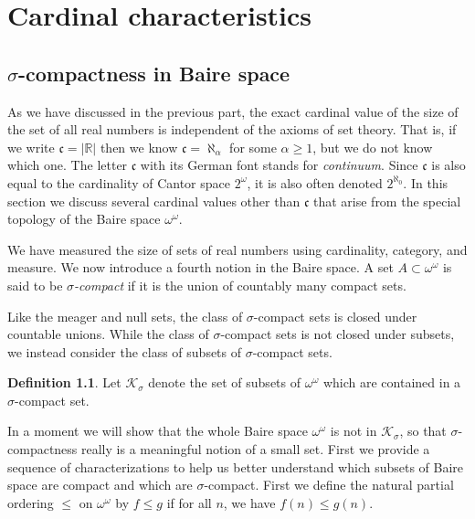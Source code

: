 \documentclass[11pt,oneside,a4paper]{amsbook}
\newcommand{\R}{\mathbb R}
\theoremstyle{definition}
\theoremstyle{plain}
\theoremstyle{definition}
\newtheorem{definition}[theorem]{Definition}
\theoremstyle{remark}
\numberwithin{equation}{section}
\numberwithin{figure}{section}
\begin{document}
\chapter{Cardinal characteristics}

\section{$\sigma$-compactness in Baire space}

As we have discussed in the previous part, the exact cardinal value of the size of the set of all real numbers is independent of the axioms of set theory. That is, if we write $\mathfrak c=|\R|$ then we know $\mathfrak c=\aleph_\alpha$ for some $\alpha\geq1$, but we do not know which one. The letter $\mathfrak c$ with its German font stands for \emph{continuum}. Since $\mathfrak c$ is also equal to the cardinality of Cantor space $2^\omega$, it is also often denoted $2^{\aleph_0}$. In this section we discuss several cardinal values other than $\mathfrak c$ that arise from the special topology of the Baire space $\omega^\omega$.

We have measured the size of sets of real numbers using cardinality, category, and measure. We now introduce a fourth notion in the Baire space. A set $A\subset\omega^\omega$ is said to be \emph{$\sigma$-compact} if it is the union of countably many compact sets.

Like the meager and null sets, the class of $\sigma$-compact sets is closed under countable unions. While the class of $\sigma$-compact sets is not closed under subsets, we instead consider the class of subsets of $\sigma$-compact sets.

\begin{definition}
  Let $\mathcal K_\sigma$ denote the set of subsets of $\omega^\omega$ which are contained in a $\sigma$-compact set.
\end{definition}

In a moment we will show that the whole Baire space $\omega^\omega$ is not in $\mathcal K_\sigma$, so that $\sigma$-compactness really is a meaningful notion of a small set. First we provide a sequence of characterizations to help us better understand which subsets of Baire space are compact and which are $\sigma$-compact. First we define the natural partial ordering $\leq$ on $\omega^\omega$ by $f\leq g$ if for all $n$, we have $f(n)\leq g(n)$.
\end{document}

